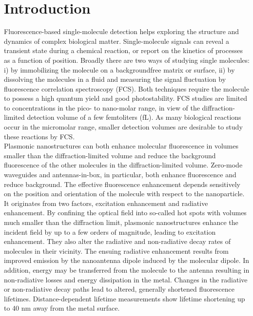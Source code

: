 \documentclass[journal=jpccck,manuscript=article]{achemso}
\begin{document}
\section{Introduction}
Fluorescence-based single-molecule detection helps exploring the structure and dynamics of complex biological 
matter.\cite{moerner1999illuminating,weiss1999fluorescence} Single-molecule signals can reveal a transient state 
during a chemical reaction, or report on the kinetics of processes as a function of position. Broadly there are two 
ways of studying single molecules: i) by immobilizing the molecule on a backgroundfree matrix or surface, 
ii) by dissolving the molecules in a fluid and measuring the signal fluctuation by fluorescence correlation 
spectroscopy (FCS).\cite{Magde1972} Both techniques require the molecule to possess a high quantum yield and good 
photostability. FCS studies are limited to concentrations in the pico- to nano-molar range, in view of the 
diffraction-limited detection volume of a few femtoliters (fL). As many biological reactions occur in the micromolar 
range\cite{craighead2006future}, smaller detection volumes are desirable to study these reactions by FCS.\\

Plasmonic nanostructures can both enhance molecular fluorescence in volumes smaller than the diffraction-limited 
volume and reduce the background fluorescence of the other molecules in the diffraction-limited volume. 
Zero-mode waveguides and antennas-in-box, in particular, both enhance fluorescence and reduce 
background.\cite{levene2003zeromode,kinkhabwala2012fluorescence,punj2013a,yuan2013thousandfold,punj2013gold} 
The effective fluorescence enhancement depends sensitively on the position and orientation of the molecule with 
respect to the nanoparticle. It originates from two factors, excitation enhancement and radiative enhancement. 
By confining the optical field into so-called hot spots with volumes much smaller than the diffraction 
limit,\cite{schuller2010plasmonics} plasmonic nanostructures enhance the incident field by up to a few orders of 
magnitude, leading to excitation enhancement.\cite{yuan2013thousandfold,anger2006enhancement,kinkhabwala2009large,
acuna2012fluorescence,busson2012accelerated,holzmeister2014quantum,khatua2014resonant} They also alter the radiative 
and non-radiative decay rates of molecules in their vicinity. The ensuing radiative enhancement results from improved 
emission by the nanoantenna dipole induced by the molecular dipole. In addition, energy may be transferred from the 
molecule to the antenna resulting in non-radiative losses and energy dissipation in the metal. Changes in the 
radiative or non-radiative decay paths lead to altered, generally shortened fluorescence 
lifetimes.\cite{khatua2014resonant,liu2007quantized,lakowicz2001radiative,dulkeith2005gold,
seelig2007nanoparticleinduced,muskens2007strong,pelton2015modified} Distance-dependent lifetime measurements show 
lifetime shortening up to 40 nm away from the metal surface.\cite{seelig2007nanoparticleinduced}\\
\end{document}

